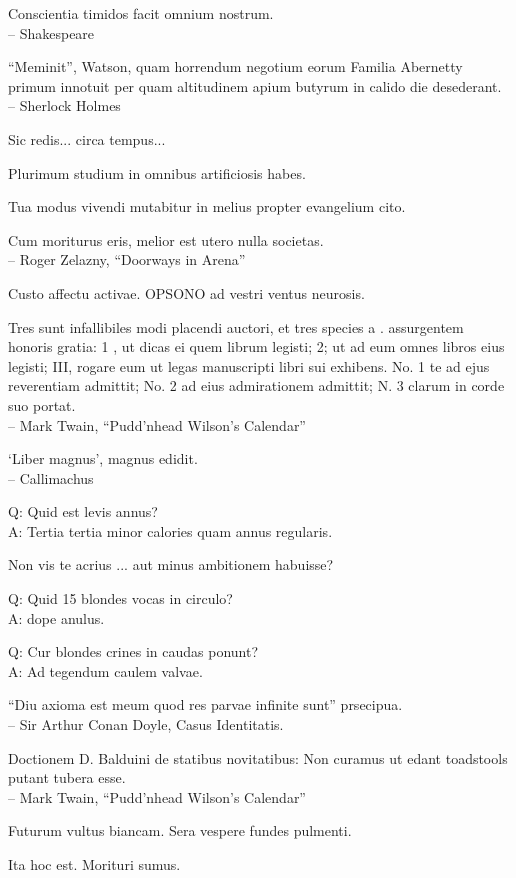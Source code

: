 \documentclass[titlepage,12pt]{memoir}
\begin{document}
Conscientia timidos facit omnium nostrum.
\\-- Shakespeare

“Meminit”, Watson, quam horrendum negotium eorum
Familia Abernetty primum innotuit per quam altitudinem
apium butyrum in calido die desederant.
\\-- Sherlock Holmes

Sic redis... circa tempus...

Plurimum studium in omnibus artificiosis habes.

Tua modus vivendi mutabitur in melius propter evangelium cito.

Cum moriturus eris, melior est utero nulla societas.
\\-- Roger Zelazny, “Doorways in Arena”

Custo affectu activae. OPSONO ad vestri ventus neurosis.

Tres sunt infallibiles modi placendi auctori, et tres species a .
assurgentem honoris gratia: 1 , ut dicas ei quem librum legisti; 2;
ut ad eum omnes libros eius legisti; III, rogare eum ut legas
manuscripti libri sui exhibens. No. 1 te ad ejus reverentiam admittit; No. 2
ad eius admirationem admittit; N. 3 clarum in corde suo portat.
\\-- Mark Twain, “Pudd’nhead Wilson’s Calendar”

‘Liber magnus’, magnus edidit.
\\-- Callimachus

Q: Quid est levis annus?\\
A: Tertia tertia minor calories quam annus regularis.

Non vis te acrius ... aut minus ambitionem habuisse?

Q: Quid 15 blondes vocas in circulo?\\
A: dope anulus.

Q: Cur blondes crines in caudas ponunt?\\
A: Ad tegendum caulem valvae.

“Diu axioma est meum quod res parvae infinite sunt”
prsecipua.
\\-- Sir Arthur Conan Doyle, Casus Identitatis.

Doctionem D. Balduini de statibus novitatibus: Non curamus ut edant toadstools
putant tubera esse.
\\-- Mark Twain, “Pudd’nhead Wilson’s Calendar”

Futurum vultus biancam. Sera vespere fundes pulmenti.

Ita hoc est. Morituri sumus.
\end{document}
